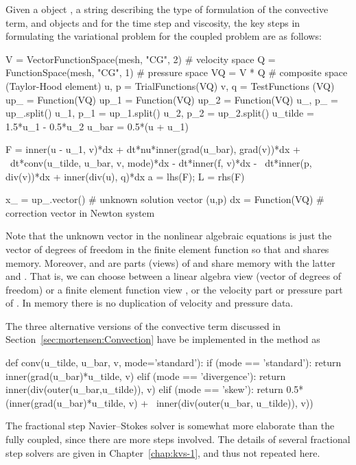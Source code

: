 Given a  object , a string  describing
the type of formulation of the convective term, and 
objects  and  for the time step and viscosity, the key
steps in formulating the variational problem for the coupled problem
are as follows:
\begin{python}
V = VectorFunctionSpace(mesh, "CG", 2)  # velocity space
Q = FunctionSpace(mesh, "CG", 1)        # pressure space
VQ = V * Q  # composite space (Taylor-Hood element)
u, p = TrialFunctions(VQ)
v, q = TestFunctions (VQ)
up_  = Function(VQ)
up_1 = Function(VQ)
up_2 = Function(VQ)
u_, p_ = up_.split()
u_1, p_1 = up_1.split()
u_2, p_2 = up_2.split()
u_tilde = 1.5*u_1 - 0.5*u_2
u_bar = 0.5*(u + u_1)

F  = inner(u - u_1, v)*dx + dt*nu*inner(grad(u_bar), grad(v))*dx + \
     dt*conv(u_tilde, u_bar, v, mode)*dx - dt*inner(f, v)*dx - \
     dt*inner(p, div(v))*dx + inner(div(u), q)*dx
a = lhs(F); L = rhs(F)

x_ = up_.vector()  # unknown solution vector (u,p)
dx = Function(VQ)  # correction vector in Newton system
\end{python}
Note that the unknown vector  in the nonlinear algebraic
equations is just the vector of degrees of freedom in the 
finite element function so that \emp{up\_} and  shares
memory. Moreover, \emp{u\_} and \emp{p\_} are parts (views) of
 and share memory with the latter and \emp{x\_}.  That is,
we can choose between a linear algebra view \emp{x\_} (vector of
degrees of freedom) or a finite element function view , or
the velocity part \emp{u\_} or pressure part \emp{p\_} of \emp{up\_}.
In memory there is no duplication of velocity and pressure data.

The three alternative versions of the convective term discussed in
Section~\ref{sec:mortensen:Convection} have be implemented in the method
\emp{conv} as
\begin{python}
def conv(u_tilde, u_bar, v, mode='standard'):
    if (mode == 'standard'):
        return inner(grad(u_bar)*u_tilde, v)
    elif (mode == 'divergence'):
        return inner(div(outer(u_bar,u_tilde)), v)
    elif (mode == 'skew'):
        return 0.5*(inner(grad(u_bar)*u_tilde, v) + \
        inner(div(outer(u_bar, u_tilde)), v))
\end{python}
The fractional step Navier--Stokes solver is somewhat more elaborate
than the fully coupled, since there are more steps involved. The
details of several fractional step solvers are given in
Chapter~\ref{chap:kvs-1}, and thus not repeated here.

